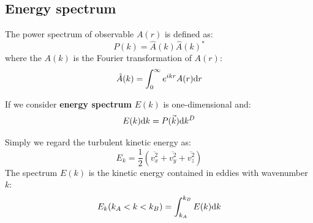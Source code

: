 \documentclass[12pt]{article}
\newcommand{\dd}{{\rm d}}
\begin{document}
    \subsection{Energy spectrum} %
    \label{sub:energy_spectrum}
        The power spectrum of observable $A(r)$ is defined as:
        \begin{equation}
            P(k)  = \hat{A}(k)\hat{A}(k)^*
        \end{equation}
        where the $A(k)$ is the Fourier transformation of $A(r)$:
        \begin{equation}
            \hat{A}(k) = \int _0 ^\infty e^{ikr}A(r)\dd r
        \end{equation}

        If we consider \textbf{energy spectrum} $E(k)$ is one-dimensional and:
        \begin{equation}
            E(k)\dd k = P(\vec{k})\dd k ^D
        \end{equation}
        \clearpage

        Simply we regard the turbulent kinetic energy as: 
        \begin{equation}
            E_k = \frac{1}{2} (\overline{v_x^2}+\overline{v_y^2}+\overline{v_z^2})
        \end{equation}
        The spectrum $E(k)$ is the kinetic energy contained in eddies with wavenumber $k$:
        \begin{equation}
            E_k (k_A<k<k_B) = \int _{k_A}^{k_B} E(k) \dd k
        \end{equation}
\end{document}
